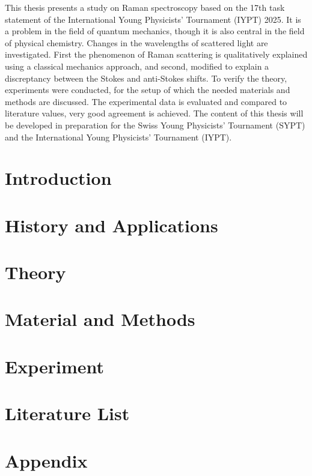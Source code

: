 \documentclass[a4paper]{article}
\begin{document}
This thesis presents a study on Raman spectroscopy based on the 17th task statement of the International Young Physicists' Tournament (IYPT) 2025. It is a problem in the field of quantum mechanics, though it is also central in the field of physical chemistry. Changes in the wavelengths of scattered light are investigated. First the phenomenon of Raman scattering is qualitatively explained using a classical mechanics approach, and second, modified to explain a discreptancy between the Stokes and anti-Stokes shifts. To verify the theory, experiments were conducted, for the setup of which the needed materials and methods are discussed. The experimental data is evaluated and compared to literature values, very good agreement is achieved. The content of this thesis will be developed in preparation for the Swiss Young Physicists' Tournament (SYPT) and the International Young Physicists' Tournament (IYPT).

\newpage

\tableofcontents
\newpage

\section{Introduction}

\newpage

\section{History and Applications}

\newpage

\section{Theory}

\newpage

\section{Material and Methods}\label{mat_met}

\newpage

\section{Experiment}


\newpage


\newpage

\section*{Literature List}
\printbibliography

\newpage

\section{Appendix}

\end{document}
